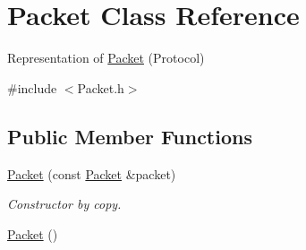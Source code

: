 \hypertarget{class_packet}{\section{Packet Class Reference}
\label{class_packet}
}


Representation of \hyperlink{class_packet}{Packet} (Protocol)  




{\ttfamily \#include $<$Packet.\-h$>$}

\subsection*{Public Member Functions}
\begin{DoxyCompactItemize}
\item 
\hyperlink{class_packet_ade4ce5d8ea9429374c83dafcf3865506}{Packet} (const \hyperlink{class_packet}{Packet} \&packet)
\begin{DoxyCompactList}\small\item\em Constructor by copy. \end{DoxyCompactList}\item 
\hypertarget{class_packet_aabcfb963c0d5bc0fa554668f92989622}{\hyperlink{class_packet_aabcfb963c0d5bc0fa554668f92989622}{Packet} ()}\label{class_packet_aabcfb963c0d5bc0fa554668f92989622}


\end{DoxyCompactItemize}
